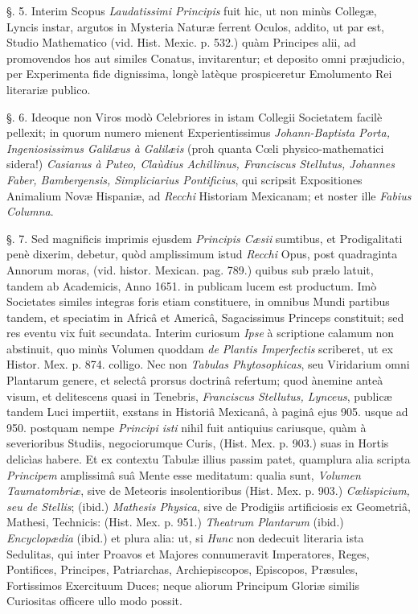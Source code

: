 \documentclass[a4paper, 11pt, oneside, polutonikogreek, german]{article}
\begin{document}
§. 5. Interim Scopus \emph{Laudatissimi Principis} fuit hic, ut non minùs Collegæ, Lyncis instar, argutos in Mysteria Naturæ ferrent Oculos, addito, ut par est, Studio Mathematico (vid. Hist. Mexic. p. 532.) quàm Principes alii, ad promovendos hos aut similes Conatus, invitarentur; et deposito omni præjudicio, per Experimenta fide dignissima, longè latèque prospiceretur Emolumento Rei literariæ publico.

§. 6. Ideoque non Viros modò Celebriores in istam Collegii Societatem facilè pellexit; in quorum numero mienent Experientissimus \emph{Johann-Baptista Porta, Ingeniosissimus Galilæus à Galilæis} (proh quanta Cœli physico-mathematici sidera!) \emph{Casianus à Puteo, Claùdius Achillinus, Franciscus Stellutus, Johannes Faber, Bambergensis, Simpliciarius Pontificius}, qui scripsit Expositiones Animalium Novæ Hispaniæ, ad \emph{Recchi} Historiam Mexicanam; et noster ille \emph{Fabius Columna}.

§. 7. Sed magnificis imprimis ejusdem \emph{Principis Cæsii} sumtibus, et Prodigalitati penè dixerim, debetur, quòd amplissimum istud \emph{Recchi} Opus, post quadraginta Annorum moras, (vid. histor. Mexican. pag. 789.) quibus sub prælo latuit, tandem ab Academicis, Anno 1651. in publicam lucem est productum. Imò Societates similes integras foris etiam constituere, in omnibus Mundi partibus tandem, et speciatim in Africâ et Americâ, Sagacissimus Princeps constituit; sed res eventu vix fuit secundata. Interim curiosum \emph{Ipse} à scriptione calamum non abstinuit, quo minùs Volumen quoddam \emph{de Plantis Imperfectis} scriberet, ut ex Histor. Mex. p. 874. colligo. Nec non \emph{Tabulas Phytosophicas}, seu Viridarium omni Plantarum genere, et selectâ prorsus doctrinâ refertum; quod ànemine anteà visum, et delitescens quasi in Tenebris, \emph{Franciscus Stellutus, Lynceus}, publicæ tandem Luci impertiit, exstans in Historiâ Mexicanâ, à paginâ ejus 905. usque ad 950. postquam nempe \emph{Principi isti} nihil fuit antiquius cariusque, quàm à severioribus Studiis, negociorumque Curis, (Hist. Mex. p. 903.) suas in Hortis delicìas habere. Et ex contextu Tabulæ illius passim patet, quamplura alia scripta \emph{Principem} amplissimâ suâ Mente esse meditatum: qualia sunt, \emph{Volumen Taumatombriæ}, sive de Meteoris insolentioribus (Hist. Mex. p. 903.) \emph{Cœlispicium, seu de Stellis}; (ibid.) \emph{Mathesis Physica}, sive de Prodigiis artificiosis ex Geometriâ, Mathesi, Technicis: (Hist. Mex. p. 951.) \emph{Theatrum Plantarum} (ibid.) \emph{Encyclopædia} (ibid.) et plura alia: ut, si \emph{Hunc} non dedecuit literaria ista Sedulitas, qui inter Proavos et Majores connumeravit Imperatores, Reges, Pontifices, Principes, Patriarchas, Archiepiscopos, Episcopos, Præsules, Fortissimos Exercituum Duces; neque aliorum Principum Gloriæ similis Curiositas officere ullo modo possit.
\end{document}

